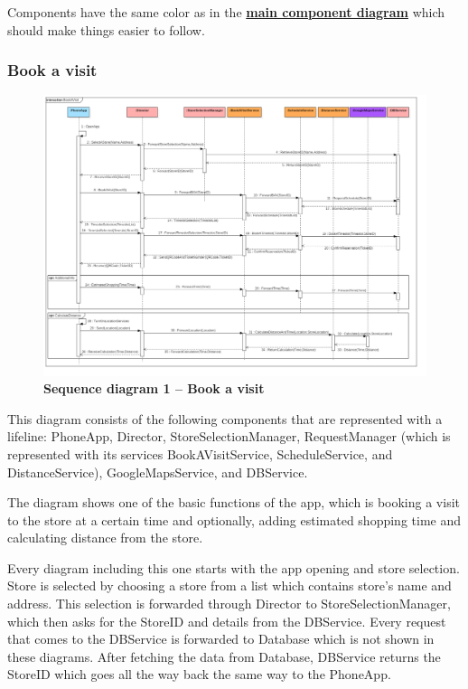  
Components have the same color as in the  \textbf{\hyperref[fig:componentdiagram1]{main component diagram}} which should make things easier to follow.  

\subsubsection{Book a visit}


\begin{figure}[!h]
\centering
\includegraphics[width=\textwidth]{Images/SequenceDiagramComponents1_BookAVisit}
\caption{\label{fig:seqdiagram1}\textbf{Sequence diagram 1 – Book a visit}}
\end{figure}
\newpage

This diagram consists of the following components that are represented with a lifeline: PhoneApp, Director, StoreSelectionManager, RequestManager (which is represented with its services BookAVisitService, ScheduleService, and DistanceService), GoogleMapsService, and DBService.  

  

The diagram shows one of the basic functions of the app, which is booking a visit to the store at a certain time and optionally, adding estimated shopping time and calculating distance from the store.  

  

Every diagram including this one starts with the app opening and store selection. Store is selected by choosing a store from a list which contains store's name and address. This selection is forwarded through Director to StoreSelectionManager, which then asks for the StoreID and details from the DBService. Every request that comes to the DBService is forwarded to Database which is not shown in these diagrams. After fetching the data from Database, DBService returns the StoreID which goes all the way back the same way to the PhoneApp.   

